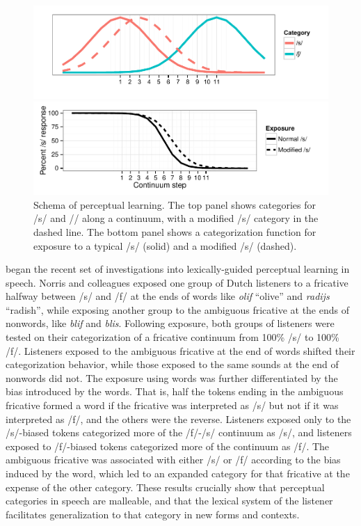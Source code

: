 \begin{figure}[!ht]
\caption{Schema of perceptual learning.  The top panel shows categories for /s/ and /\textesh/ along a continuum, with a modified /s/ category in the dashed line. The bottom panel shows a categorization function for exposure to a typical /s/ (solid) and a modified /s/ (dashed).}
\label{fig:perceptuallearning}
\includegraphics[width=1.0\textwidth]{graphs/dist}

\includegraphics[width=1.0\textwidth]{graphs/class}
\end{figure}

\citet{Norris2003} began the recent set of investigations into lexically-guided perceptual learning in speech.
Norris and colleagues exposed one group of Dutch listeners to a fricative halfway between /s/ and /f/ at the ends of words like \emph{olif} ``olive'' and \emph{radijs} ``radish'', while exposing another group to the ambiguous fricative at the ends of nonwords, like \emph{blif} and \emph{blis}.
Following exposure, both groups of listeners were tested on their categorization of a fricative continuum from 100\% /s/ to 100\% /f/. 
Listeners exposed to the ambiguous fricative at the end of words shifted their categorization behavior, while those exposed to the same sounds at the end of nonwords did not.  The exposure using words was further differentiated by the bias introduced by the words.  That is, half the tokens ending in the ambiguous fricative formed a word if the fricative was interpreted as /s/ but not if it was interpreted as /f/, and the others were the reverse.  
Listeners exposed only to the /s/-biased tokens categorized more of the /f/-/s/ continuum as /s/, and listeners exposed to /f/-biased tokens categorized more of the continuum as /f/.  
The ambiguous fricative was associated with either /s/ or /f/ according to the bias induced by the word, which led to an expanded category for that fricative at the expense of the other category.
These results crucially show that perceptual categories in speech are malleable, and that the lexical system of the listener facilitates generalization to that category in new forms and contexts.

